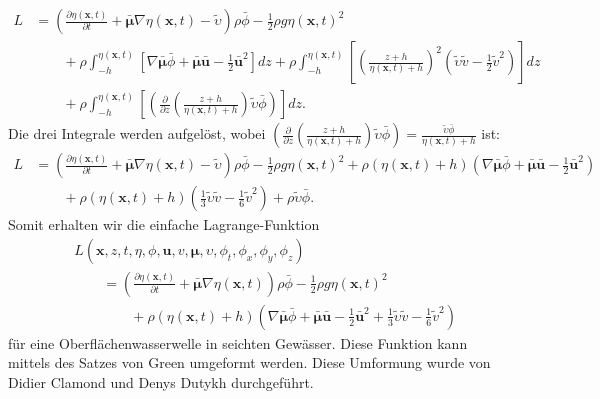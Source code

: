\begin{align*}
	L&=
	\left(\frac{\partial \eta(\bm{x}, t)}{\partial t}
	+
	\bar{\bm{\mu}}  \nabla \eta(\bm{x}, t)
	-
	\widetilde{\upsilon}\right)\rho \bar{\phi}
	-
	\frac{1}{2}\rho g \eta(\bm{x}, t)^2
	\\
	&\qquad+
	\rho\int_{-h}^{\eta(\bm{x}, t)} \left[ \nabla \bar{\bm{\mu}}\bar{\phi} + \bar{\bm{\mu}}\bar{\bm{u}} - \frac{1}{2} \bar{\bm{u}}^2\right] dz
	+
	\rho\int_{-h}^{\eta(\bm{x}, t)} \left[ \left(\frac{z + h}{\eta(\bm{x}, t) + h}\right)^2 \left(\tilde{\upsilon}\tilde{v} - \frac{1}{2} \tilde{v}^2\right)\right] dz
	\\
	&\qquad+
	\rho\int_{-h}^{\eta(\bm{x}, t)} \left[ \left(\frac{\partial}{\partial z} \left(\frac{z + h}{\eta(\bm{x}, t) + h}\right)\tilde{\upsilon} \bar{\phi} \right)\right] dz.
\end{align*}
Die drei Integrale werden aufgelöst, wobei $\left(\frac{\partial}{\partial z} \left(\frac{z + h}{\eta(\bm{x}, t) + h}\right)\tilde{\upsilon} \bar{\phi} \right) = \frac{\tilde{\upsilon} \bar{\phi}}{\eta(\bm{x}, t) + h}$ ist:
\begin{align*}
L&=
\left(\frac{\partial \eta(\bm{x}, t)}{\partial t}
+
\bar{\bm{\mu}} \nabla \eta(\bm{x}, t)
-
\widetilde{\upsilon}\right)\rho \bar{\phi}
-
\frac{1}{2}\rho g \eta(\bm{x}, t)^2
+
\rho(\eta(\bm{x}, t) + h) \left(\nabla \bar{\bm{\mu}}\bar{\phi} + \bar{\bm{\mu}}\bar{\bm{u}} - \frac{1}{2} \bar{\bm{u}}^2\right)
\\
&\qquad
+
\rho(\eta(\bm{x}, t) + h) \left(\frac{1}{3}\tilde{\upsilon}\tilde{v} - \frac{1}{6}\tilde{v}^2 \right)
+
\rho\tilde{\upsilon} \bar{\phi}.
\end{align*}
Somit erhalten wir die einfache Lagrange-Funktion
\begin{align*}
&L(\bm{x},z,t,\eta,\phi,\bm{u}, v, \bm{\mu},\upsilon,\phi_t,\phi_x,\phi_y,\phi_z)
\\
&\qquad
=\left(\frac{\partial \eta(\bm{x}, t)}{\partial t}
+
\bar{\bm{\mu}} \nabla \eta(\bm{x}, t) \right)\rho \bar{\phi}
-
\frac{1}{2}\rho g \eta(\bm{x}, t)^2
\\
&\qquad\qquad
+
\rho(\eta(\bm{x}, t) + h) \left(\nabla \bar{\bm{\mu}}\bar{\phi} + \bar{\bm{\mu}}\bar{\bm{u}} - \frac{1}{2} \bar{\bm{u}}^2 + \frac{1}{3} \tilde{\upsilon}\tilde{v} - \frac{1}{6}\tilde{v}^2\right)
\end{align*}
für eine Oberflächenwasserwelle in seichten Gewässer.
Diese Funktion kann mittels des Satzes von Green umgeformt werden.
Diese Umformung wurde von Didier Clamond und Denys Dutykh \cite{luke:CLAMOND201225} durchgeführt.
